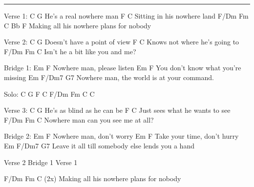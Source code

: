 \noindent\rule{\columnwidth}{1pt}
\begin{lstsong}
Verse 1:
C           G
He's a real nowhere man
F              C
Sitting in his nowhere land
F/Dm           Fm                C      Bb F
Making all his nowhere plans for nobody

Verse 2:
C              G
Doesn't have a point of view
F                    C
Knows not where he's going to
F/Dm       Fm               C
Isn't he a bit like you and me?

Bridge 1:
        Em          F
Nowhere man, please listen
          Em               F
You don't know what you're missing
        Em       F/Dm7               G7
Nowhere man, the world is at your command.

Solo: C G F C F/Dm Fm C C

Verse 3:
C                G
He's as blind as he can be
F                 C
Just sees what he wants to see
F/Dm            Fm            C
Nowhere man can you see me at all?

Bridge 2:
        Em         F
Nowhere man, don't worry
          Em          F
Take your time, don't hurry
         Em       F/Dm7                     G7
Leave it all till somebody else lends you a hand

Verse 2
Bridge 1
Verse 1

F/Dm           Fm                C      (2x)
Making all his nowhere plans for nobody
\end{lstsong}
\newpage
